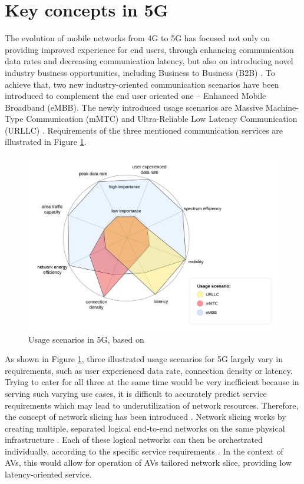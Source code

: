\documentclass[12pt,a4paper,twoside]{report}
\begin{document}
\section{Key concepts in 5G}
The evolution of mobile networks from 4G to 5G has focused not only on providing improved experience for end users, through enhancing communication data rates and decreasing communication latency, but also on introducing novel industry business opportunities, including Business to Business (B2B) \cite{rommer20195g}. To achieve that, two new industry-oriented communication scenarios have been introduced to complement the end user oriented one – Enhanced Mobile Broadband (eMBB). The newly introduced usage scenarios are Massive Machine-Type Communication (mMTC) and Ultra-Reliable Low Latency Communication (URLLC) \cite{rommer20195g}. Requirements of the three mentioned communication services are illustrated in Figure \ref{F:usage-scenarios}.
\begin{figure}[ht]
	\centering
	\includegraphics[width=\textwidth]{./images/usage-scenarios.png}
	\caption{Usage scenarios in 5G, based on \cite{dahlman-2020-5g}}
	\label{F:usage-scenarios}
  \end{figure}

As shown in Figure \ref{F:usage-scenarios}, three illustrated usage scenarios for 5G largely vary in requirements, such as user experienced data rate, connection density or latency. Trying to cater for all three at the same time would be very inefficient because in serving such varying use cases, it is difficult to accurately predict service requirements which may lead to underutilization of network resources. Therefore, the concept of network slicing has been introduced \cite{yousaf2017nfv}. Network slicing works by creating multiple, separated logical end-to-end networks on the same physical infrastructure \cite{yousaf2017nfv}. Each of these logical networks can then be orchestrated individually, according to the specific service requirements \cite{yousaf2017nfv}. In the context of AVs, this would allow for operation of AVs tailored network slice, providing low latency-oriented service.
\end{document}
